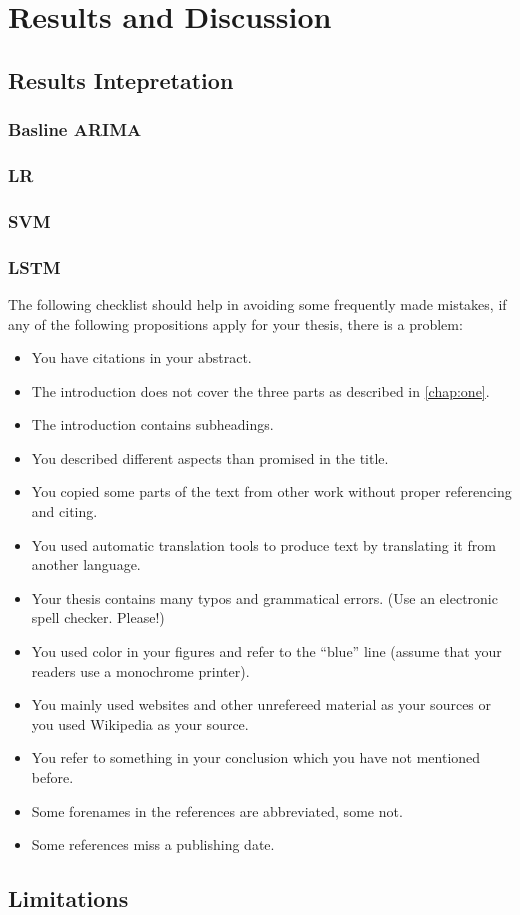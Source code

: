 \chapter{Results and Discussion}
\label{chap:five}

\section{Results Intepretation}
\label{sec:results}

\subsection{Basline \acl{ARIMA}}
\subsection{\acl{LR}}
\subsection{\acl{SVM}}
\subsection{\acl{LSTM}}


The following checklist should help in avoiding some frequently made mistakes, if any of the following propositions apply for your thesis, there is a problem:

\begin{itemize} 
		\item You have citations in your abstract.
		\item The introduction does not cover the three parts as described in \autoref{chap:one}.
		\item The introduction contains subheadings.
		\item You described different aspects than promised in the title.
		\item You copied some parts of the text from other work without proper referencing and citing.
		\item You used automatic translation tools to produce text by translating it from another language.
		\item Your thesis contains many typos and grammatical errors. (Use an electronic spell checker. Please!)
		\item You used color in your figures and refer to the ``blue'' line (assume that your readers use a monochrome printer).
		\item You mainly used websites and other unrefereed material as your sources or you used Wikipedia as your source.
		\item You refer to something in your conclusion which you have not mentioned before.
		\item Some forenames in the references are abbreviated, some not.
		\item Some references miss a publishing date.
\end{itemize}


\section{Limitations}
\label{sec:limitations}
